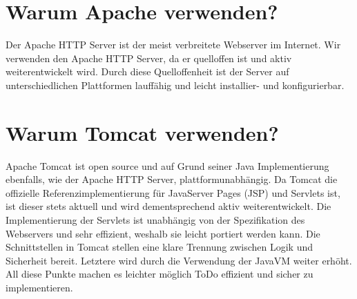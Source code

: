 \section{Warum Apache verwenden?}

Der Apache HTTP Server ist der meist verbreitete Webserver im Internet. 
Wir verwenden den Apache HTTP Server, da er quelloffen ist und aktiv weiterentwickelt wird. Durch diese Quelloffenheit ist der Server auf unterschiedlichen Plattformen lauffähig und leicht installier- und konfigurierbar.

 
\section{Warum Tomcat verwenden?}

Apache Tomcat ist open source und auf Grund seiner Java Implementierung ebenfalls, wie der Apache HTTP Server, plattformunabhängig. Da Tomcat die offizielle Referenzimplementierung für JavaServer Pages (JSP) und Servlets ist, ist dieser stets aktuell und wird dementsprechend aktiv weiterentwickelt. Die Implementierung der Servlets ist unabhängig von der Spezifikation des Webservers und sehr effizient, weshalb sie leicht portiert werden kann. 
Die Schnittstellen in Tomcat stellen eine klare Trennung zwischen Logik und Sicherheit bereit. Letztere wird durch die Verwendung der JavaVM weiter erhöht. 
All diese Punkte machen es leichter möglich ToDo effizient und sicher zu implementieren.  